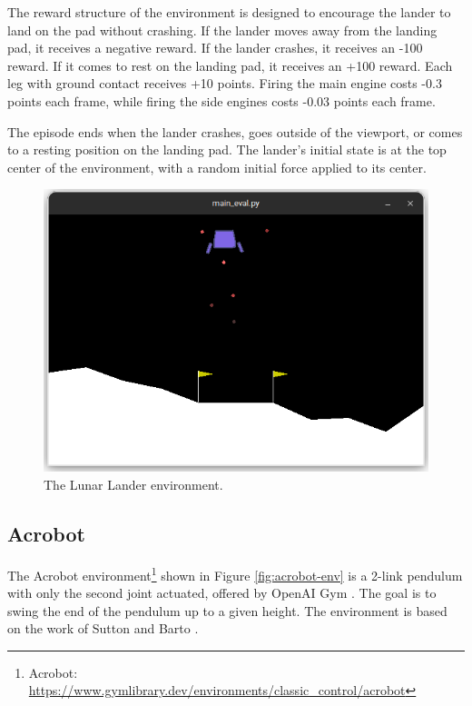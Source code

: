 \documentclass[conference]{IEEEtran}
\begin{document}
The reward structure of the environment is designed to encourage the lander to land on the pad without crashing. If the lander moves away from the landing pad, it receives a negative reward. If the lander crashes, it receives an -100 reward. If it comes to rest on the landing pad, it receives an +100 reward. Each leg with ground contact receives +10 points. Firing the main engine costs -0.3 points each frame, while firing the side engines costs -0.03 points each frame.

The episode ends when the lander crashes, goes outside of the viewport, or comes to a resting position on the landing pad. The lander's initial state is at the top center of the environment, with a random initial force applied to its center.

\begin{figure}[htbp]
    \centerline{\includegraphics[width=\columnwidth]{./img/lunar-lander-env.png}}
    \caption{The Lunar Lander environment.}
    \label{fig:lunar-lander-env}
\end{figure}


\subsection{Acrobot}

The Acrobot environment\footnote{Acrobot: \url{https://www.gymlibrary.dev/environments/classic_control/acrobot}} shown in Figure \ref{fig:acrobot-env} is a 2-link pendulum with only the second joint actuated, offered by OpenAI Gym \cite{brockman2016openai}. The goal is to swing the end of the pendulum up to a given height. The environment is based on the work of Sutton and Barto \cite{sutton2018reinforcement}.
\end{document}
